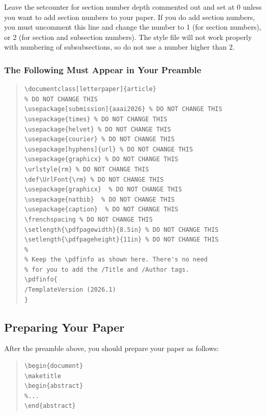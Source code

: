 \documentclass[letterpaper]{article} %
\def\UrlFont{\rm}  %
\begin{document}
Leave the setcounter for section number depth commented out and set at 0
unless you want to add section numbers to your paper. If you do add
section numbers, you must uncomment this line and change the number to 1
(for section numbers), or 2 (for section and subsection numbers). The
style file will not work properly with numbering of subsubsections, so
do not use a number higher than 2.

\subsubsection{The Following Must Appear in Your Preamble}
\begin{quote}
\begin{scriptsize}\begin{verbatim}
\documentclass[letterpaper]{article}
% DO NOT CHANGE THIS
\usepackage[submission]{aaai2026} % DO NOT CHANGE THIS
\usepackage{times} % DO NOT CHANGE THIS
\usepackage{helvet} % DO NOT CHANGE THIS
\usepackage{courier} % DO NOT CHANGE THIS
\usepackage[hyphens]{url} % DO NOT CHANGE THIS
\usepackage{graphicx} % DO NOT CHANGE THIS
\urlstyle{rm} % DO NOT CHANGE THIS
\def\UrlFont{\rm} % DO NOT CHANGE THIS
\usepackage{graphicx}  % DO NOT CHANGE THIS
\usepackage{natbib}  % DO NOT CHANGE THIS
\usepackage{caption}  % DO NOT CHANGE THIS
\frenchspacing % DO NOT CHANGE THIS
\setlength{\pdfpagewidth}{8.5in} % DO NOT CHANGE THIS
\setlength{\pdfpageheight}{11in} % DO NOT CHANGE THIS
%
% Keep the \pdfinfo as shown here. There's no need
% for you to add the /Title and /Author tags.
\pdfinfo{
/TemplateVersion (2026.1)
}
\end{verbatim}\end{scriptsize}
\end{quote}

\subsection{Preparing Your Paper}

After the preamble above, you should prepare your paper as follows:

\begin{quote}
\begin{scriptsize}\begin{verbatim}
\begin{document}
\maketitle
\begin{abstract}
%...
\end{abstract}\end{verbatim}\end{scriptsize}
\end{quote}
\end{document}
